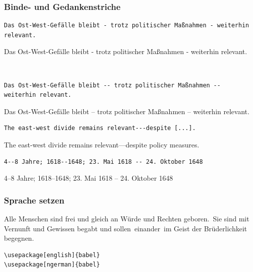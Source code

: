 \documentclass{beamer}
\begin{document}
\begin{frame}[fragile]
    \frametitle{Binde- und Gedankenstriche}%
    \begin{wrong}
        \begin{lstlisting}
Das Ost-West-Gefälle bleibt - trotz politischer Maßnahmen - weiterhin relevant.
        \end{lstlisting}
        Das Ost-West-Gefälle bleibt - trotz politischer Maßnahmen - weiterhin relevant.
    \end{wrong}\\[2ex]\pause

    \begin{lstlisting}
Das Ost-West-Gefälle bleibt -- trotz politischer Maßnahmen -- weiterhin relevant.
    \end{lstlisting}
    Das Ost-West-Gefälle bleibt -- trotz politischer Maßnahmen -- weiterhin relevant.\\[2ex]\pause

    \begin{lstlisting}
The east-west divide remains relevant---despite [...].
    \end{lstlisting}
    The east-west divide remains relevant---despite policy measures.\\[2ex]
    \pause

    \begin{lstlisting}
4--8 Jahre; 1618--1648; 23. Mai 1618 -- 24. Oktober 1648
    \end{lstlisting}
    4--8 Jahre; 1618--1648; 23. Mai 1618 -- 24. Oktober 1648
\end{frame}

\begin{frame}[fragile]
    \frametitle{Sprache setzen}%
    \begin{justify}
        Alle Menschen sind frei und gleich an Würde und Rechten ge\-boren.~Sie sind mit Vernunft und Gewissen begabt und sollen~ei\-nan\-der~im Geist der Brüderlichkeit begegnen.
    \end{justify}

    \begin{lstlisting}
\usepackage[english]{babel}
\usepackage[ngerman]{babel}
    \end{lstlisting}
\end{frame}
\end{document}
